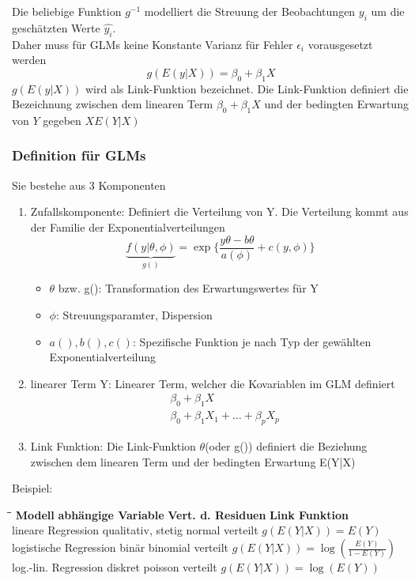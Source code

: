\documentclass[10pt]{report}
\theoremstyle{definition}
\begin{document}
Die beliebige Funktion \(g^{-1}\) modelliert die Streuung der Beobachtungen \( y_i\) um die geschätzten Werte \(\hat{y_i}\). \\
Daher muss für GLMs keine Konstante Varianz für Fehler \(\epsilon_i\) vorausgesetzt werden
\[
g(E(y|X)) = \beta_0 + \beta_1 X
\]
\(g(E(y|X))\) wird als Link-Funktion bezeichnet.
Die Link-Funktion definiert die Bezeichnung zwischen dem linearen Term \(\beta_0+ \beta_1 X\) und der bedingten Erwartung von \(Y\) gegeben \(X E(Y|X)\)

\subsubsection*{Definition für GLMs}
Sie bestehe aus 3 Komponenten 
\begin{enumerate}
	\item Zufallskomponente: Definiert die Verteilung von Y. 
	Die Verteilung kommt aus der Familie der Exponentialverteilungen	
	\[
	\underbrace{f(y | \theta, \phi)}_{g()} = \exp\{\frac{y\theta- b\theta}{a(\phi)} + c(y, \phi)\}
	\]
	\begin{itemize}
		\item [] \(\theta\) bzw. g(): Transformation des Erwartungswertes für Y
		\item [] \(\phi\): Streuungsparamter, Dispersion
		\item [] \(a(),b(), c()\): Spezifische Funktion je nach Typ der gewählten Exponentialverteilung
		
	\end{itemize}

	\item linearer Term Y:
	Linearer Term, welcher die Kovariablen im GLM definiert
	\begin{align*}
		&\beta_0 +\beta_1 X \\
		&\beta_0 + \beta_1 X_1 + \ldots + \beta_p X_p
	\end{align*}
	
	\item Link Funktion:
	Die Link-Funktion \(\theta\)(oder g()) definiert die Beziehung zwischen dem linearen Term und der bedingten Erwartung E(Y|X)
\end{enumerate}

Beispiel:
\begin{tabbing}
	\hspace{0.25\linewidth}\=\hspace{0.25\linewidth}\=\hspace{0.25\linewidth}\=\kill
	\textbf{Modell}	\>  \textbf{abhängige Variable}\>  \textbf{Vert. d. Residuen}\> \textbf{Link Funktion}\\ 
	lineare Regression\>  qualitativ, stetig\>  normal verteilt\> \(g(E(Y|X)) = E(Y)\)\\ 
	logistische Regression\>  binär\>  binomial verteilt\> \(g(E(Y|X)) = \log(\frac{E(Y)}{1-E(Y)}) \)\\ 
	log.-lin. Regression\>  diskret \>  poisson verteilt\> \(g(E(Y|X)) = \log(E(Y))\)\\
\end{tabbing} 
\end{document}
